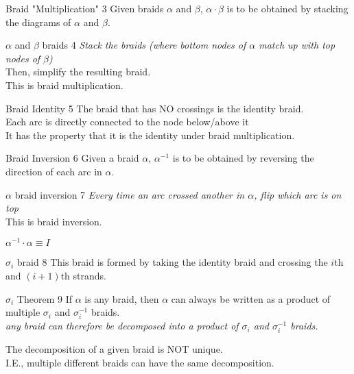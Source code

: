\documentclass{report}
\begin{document}
\begin{definition} {Braid "Multiplication"} { 3 }
  Given braids $\alpha$ and $\beta$, $\alpha \cdot \beta$ is to be obtained by stacking the diagrams of  $\alpha$ and  $\beta.$
  \begin{example} {$\alpha$ and  $\beta$ braids} { 4 }
    \textit {Stack the braids (where bottom nodes of $\alpha$ match up with top nodes of  $\beta$) } \\
    Then, simplify the resulting braid. \\
    This is braid multiplication. \\
  \end{example}
\end{definition}

\begin{definition} {Braid Identity} { 5 }
  The braid that has NO crossings is the identity braid. \\
  Each arc is directly connected to the node below/above it \\
  It has the property that it is the identity under braid multiplication. \\
\end{definition}

\begin{definition} {Braid Inversion} { 6 }
  Given a braid $\alpha$, $\alpha^{-1}$ is to be obtained by reversing the direction of each arc in $\alpha$. \\
  \begin{example} {$\alpha$ braid inversion} { 7 }
    \textit {Every time an arc crossed another in $\alpha$, flip which arc is on top} \\
    This is braid inversion. \\
    \par $\alpha^{-1} \cdot \alpha \equiv I$ \\
  \end{example}
\end{definition}

\begin{example} {$\sigma_i$ braid} { 8 }
  This braid is formed by taking the identity braid and crossing the $i$th and $(i+1)$th strands. \\
  \begin{theorem} {$\sigma_i$ Theorem} { 9 }
    If $\alpha$ is any braid, then  $\alpha$ can always be written as a product of multiple  $\sigma_i$ and  $\sigma_i^{-1}$ braids. \\

  \textit {any braid can therefore be decomposed into a product of $\sigma_i$ and $\sigma_i^{-1}$ braids.} \\
  \begin{note} 
   The decomposition of a given braid is NOT unique. \\
   I.E., multiple different braids can have the same decomposition. \\
  \end{note}
  
 \end{theorem} 
\end{example}
\end{document}
